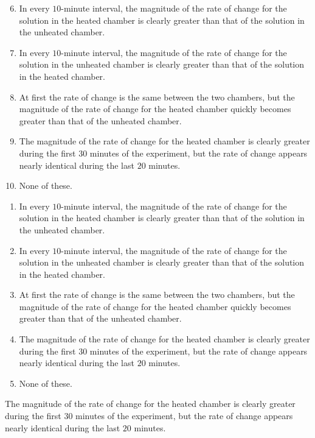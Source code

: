 \ifacteven
	\begin{enumerate}[label=\textbf{\Alph*.},itemsep=\fill,align=left]
		\setcounter{enumii}{5}
		\item In every $10$-minute interval, the magnitude of the rate of change for the solution in the heated chamber is clearly greater than that of the solution in the unheated chamber.
		\item In every $10$-minute interval, the magnitude of the rate of change for the solution in the unheated chamber is clearly greater than that of the solution in the heated chamber.
		\item At first the rate of change is the same between the two chambers, but the magnitude of the rate of change for the heated chamber quickly becomes greater than that of the unheated chamber.
		\addtocounter{enumii}{1}
		\item The magnitude of the rate of change for the heated chamber is clearly greater during the first $30$ minutes of the experiment, but the rate of change appears nearly identical during the last $20$ minutes. %
		\item None of these. 
	\end{enumerate}
\else
\fi

\ifactodd
	\begin{enumerate}[label=\textbf{\Alph*.},itemsep=\fill,align=left]
		\item In every $10$-minute interval, the magnitude of the rate of change for the solution in the heated chamber is clearly greater than that of the solution in the unheated chamber.
		\item In every $10$-minute interval, the magnitude of the rate of change for the solution in the unheated chamber is clearly greater than that of the solution in the heated chamber.
		\item At first the rate of change is the same between the two chambers, but the magnitude of the rate of change for the heated chamber quickly becomes greater than that of the unheated chamber.
		\item The magnitude of the rate of change for the heated chamber is clearly greater during the first $30$ minutes of the experiment, but the rate of change appears nearly identical during the last $20$ minutes. %
		\item None of these. 
	\end{enumerate}
\else
\fi

\ifgridin
 The magnitude of the rate of change for the heated chamber is clearly greater during the first $30$ minutes of the experiment, but the rate of change appears nearly identical during the last $20$ minutes. %

\else
\fi


